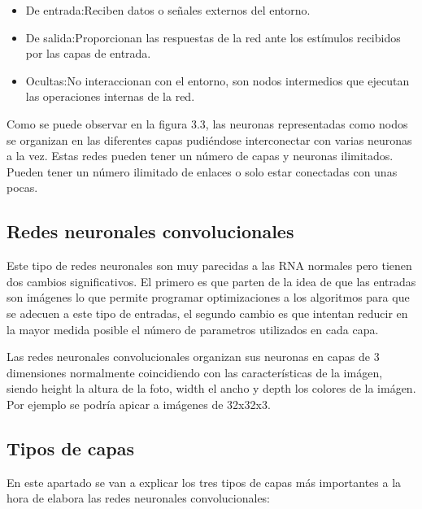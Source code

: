 \begin{itemize}
	\item{De entrada}:Reciben datos o señales externos del entorno.
	\item{De salida}:Proporcionan las respuestas de la red ante los estímulos recibidos por las capas de entrada.
	\item{Ocultas}:No interaccionan con el entorno, son nodos intermedios que ejecutan las operaciones internas de la red.
\end{itemize}



Como se puede observar en la figura 3.3, las neuronas representadas como nodos se organizan en las diferentes capas pudiéndose interconectar con varias neuronas a la vez. Estas redes pueden tener un número de capas y neuronas ilimitados. Pueden tener un número ilimitado de enlaces o solo estar conectadas con unas pocas.

\subsection{Redes neuronales convolucionales}

Este tipo de redes neuronales son muy parecidas a las RNA normales pero tienen dos cambios significativos. El primero es que parten de la idea de que las entradas son imágenes lo que permite programar optimizaciones a los algoritmos para que se adecuen a este tipo de entradas, el segundo cambio es que intentan reducir en la mayor medida posible el número de parametros utilizados en cada capa.



Las redes neuronales convolucionales organizan sus neuronas en capas de 3 dimensiones normalmente coincidiendo con las características de la imágen, siendo height la altura de la foto, width el ancho y depth los colores de la imágen. Por ejemplo se podría apicar a imágenes de 32x32x3.

\subsection{Tipos de capas}

En este apartado se van a explicar los tres tipos de capas más importantes a la hora de elabora las redes neuronales convolucionales:
